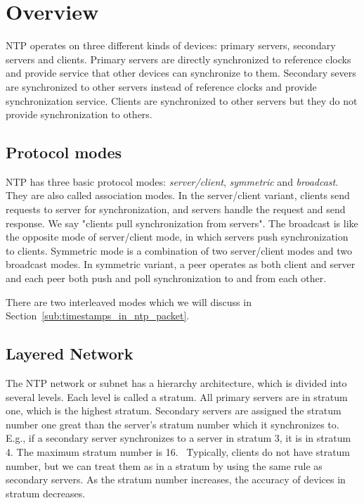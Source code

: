 
\chapter{Overview}
NTP operates on three different kinds of devices: primary servers, secondary
servers and clients. Primary servers are directly synchronized to reference
clocks and provide service that other devices can synchronize to them.
Secondary severs are synchronized to other servers instead of reference clocks
and provide synchronization service. Clients are synchronized to other servers
but they do not provide synchronization to others.

\section{Protocol modes}%
\label{sec:protocol_modes}
NTP has three basic protocol modes: \emph{server/client}, \emph{symmetric}
and \emph{broadcast}. They are also called association modes. 
In the server/client variant, clients send requests to server for
synchronization, and servers handle the request and send response. We say
"clients pull synchronization from servers". The broadcast is like the
opposite mode of server/client mode, in which servers push synchronization to
clients. Symmetric mode is a combination of two server/client modes and two
broadcast modes. In symmetric variant, a peer operates as both client and
server and each peer both push and poll synchronization to and from each
other.~\cite{rfc5905}

There are two interleaved modes which we will discuss in
Section~\ref{sub:timestamps_in_ntp_packet}.

\section{Layered Network}
\label{sec:Layered_network}
The NTP network or subnet has a hierarchy architecture, which is divided into
several levels. Each level is called a stratum. All primary servers are in
stratum one, which is the highest stratum. Secondary servers are assigned the
stratum number one great than the server's stratum number which it synchronizes
to. E.g., if a secondary server synchronizes to a server in stratum 3, it is in
stratum 4. The maximum stratum number is 16.~\cite{rfc5905}
Typically, clients do not have stratum number, but we can treat them
as in a stratum by using the same rule as secondary servers.
As the stratum number increases, the accuracy of devices in stratum
decreases.

